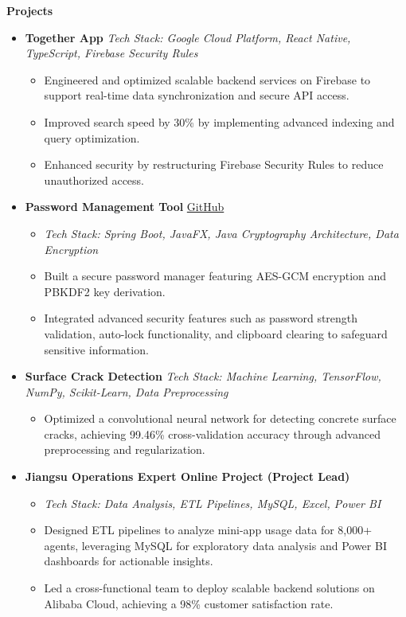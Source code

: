 \documentclass[a4paper,10pt]{article}
\begin{document}
\vspace{0.2cm}
\noindent \textbf{\Large Projects}
\begin{itemize}[leftmargin=*]
    \item \textbf{Together App} \hfill \textit{Tech Stack: Google Cloud Platform, React Native, TypeScript, Firebase Security Rules}
    \begin{itemize}
        \item Engineered and optimized scalable backend services on Firebase to support real-time data synchronization and secure API access.
        \item Improved search speed by 30\% by implementing advanced indexing and query optimization.
        \item Enhanced security by restructuring Firebase Security Rules to reduce unauthorized access.
    \end{itemize}

    \item \textbf{Password Management Tool} \hfill \href{https://github.com/your-repo}{GitHub}
    \begin{itemize}
        \item \textit{Tech Stack: Spring Boot, JavaFX, Java Cryptography Architecture, Data Encryption}
        \item Built a secure password manager featuring AES-GCM encryption and PBKDF2 key derivation.
        \item Integrated advanced security features such as password strength validation, auto-lock functionality, and clipboard clearing to safeguard sensitive information.
    \end{itemize}

    \item \textbf{Surface Crack Detection} \hfill \textit{Tech Stack: Machine Learning, TensorFlow, NumPy, Scikit-Learn, Data Preprocessing}
    \begin{itemize}
        \item Optimized a convolutional neural network for detecting concrete surface cracks, achieving 99.46\% cross-validation accuracy through advanced preprocessing and regularization.
    \end{itemize}

    \item \textbf{Jiangsu Operations Expert Online Project (Project Lead)}
    \begin{itemize}
        \item \textit{Tech Stack: Data Analysis, ETL Pipelines, MySQL, Excel, Power BI}
        \item Designed ETL pipelines to analyze mini-app usage data for 8,000+ agents, leveraging MySQL for exploratory data analysis and Power BI dashboards for actionable insights.
        \item Led a cross-functional team to deploy scalable backend solutions on Alibaba Cloud, achieving a 98\% customer satisfaction rate.
    \end{itemize}
\end{itemize}
\end{document}
